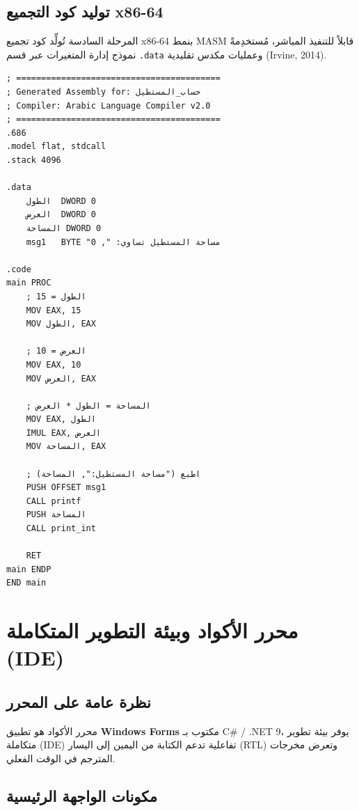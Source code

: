 \documentclass[12pt,a4paper]{report}
\begin{document}
\section{توليد كود التجميع x86-64}

المرحلة السادسة تُولِّد كود تجميع x86-64 بنمط MASM قابلاً للتنفيذ المباشر، مُستخدِمةً نموذج إدارة المتغيرات عبر قسم \texttt{.data} وعمليات مكدس تقليدية (Irvine, 2014).

\begin{CodeBox}[title={\small مثال على مخرجات كود التجميع x86 — برنامج الحساب}]
\begin{lstlisting}[style=TACStyle]
; =========================================
; Generated Assembly for: حساب_المستطيل
; Compiler: Arabic Language Compiler v2.0
; =========================================
.686
.model flat, stdcall
.stack 4096

.data
    الطول  DWORD 0
    العرض  DWORD 0
    المساحة DWORD 0
    msg1   BYTE "مساحة المستطيل تساوي: ", 0

.code
main PROC
    ; الطول = 15
    MOV EAX, 15
    MOV الطول, EAX

    ; العرض = 10
    MOV EAX, 10
    MOV العرض, EAX

    ; المساحة = الطول * العرض
    MOV EAX, الطول
    IMUL EAX, العرض
    MOV المساحة, EAX

    ; اطبع ("مساحة المستطيل:", المساحة)
    PUSH OFFSET msg1
    CALL printf
    PUSH المساحة
    CALL print_int

    RET
main ENDP
END main
\end{lstlisting}
\end{CodeBox}

\chapter{محرر الأكواد وبيئة التطوير المتكاملة (IDE)}

\section{نظرة عامة على المحرر}

محرر الأكواد هو تطبيق \textbf{Windows Forms} مكتوب بـ C\# / .NET 9، يوفر بيئة تطوير متكاملة (IDE) تفاعلية تدعم الكتابة من اليمين إلى اليسار (RTL) وتعرض مخرجات المترجم في الوقت الفعلي.

\section{مكونات الواجهة الرئيسية}
\end{document}
